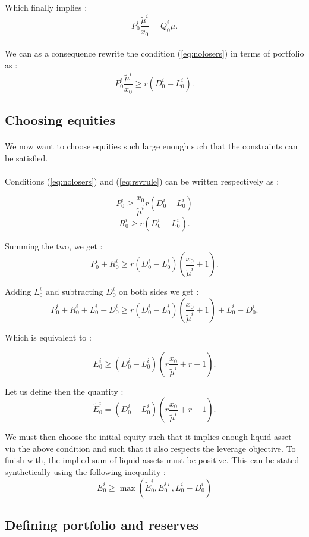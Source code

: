 \documentclass{article}
\begin{document}
\begin{appendices}
Which finally implies : 
$$ P_0^i \frac{\tilde{\mu}^i}{x_0} = Q_0^{i} \mu.$$

\paragraph{}
We can as a consequence rewrite the condition (\ref{eq:nolosers}) in terms of portfolio as :
$$P_0^i \frac{\tilde{\mu}^i}{x_0} \geq r(D_0^i - L_0^i).$$

\subsection{Choosing equities}

\paragraph{}
We now want to choose equities such large enough such that the constraints can be satisfied. 

\paragraph{}
Conditions (\ref{eq:nolosers}) and (\ref{eq:rsvrule}) can be written respectively as : 

$$P_0^i \geq \frac{x_0}{\tilde{\mu}^i}r(D_0^i - L_0^i)$$
$$R_0^i \geq r(D_0^i - L_0^i).$$

Summing the two, we get : 
$$P_0^i + R_0^i  \geq r(D_0^i - L_0^i)(\frac{x_0}{\tilde{\mu}^i} + 1).$$

Adding $L_0^i$ and subtracting  $D_0^i$ on both sides we get : 
$$P_0^i + R_0^i + L_0^i - D_0^i \geq r(D_0^i - L_0^i)(\frac{x_0}{\tilde{\mu}^i} + 1) + L_0^i - D_0^i.$$

Which is equivalent to : 

$$E_0^i\geq (D_0^i - L_0^i)(r\frac{x_0}{\tilde{\mu}^i} + r - 1).$$

Let us define then the quantity :
$$\tilde{E}_0^i = (D_0^i - L_0^i)(r\frac{x_0}{\tilde{\mu}^i} + r - 1).$$

We must then choose the initial equity such that it implies enough liquid asset via the above condition and such that it also respects the leverage objective. To finish with, the implied sum of liquid assets must be positive. This can be stated synthetically using the following inequality : 
$$E_0^i\geq \max (\tilde{E}_0^i, E_0^{i \star}, L_0^i - D_0^i ) $$

\subsection{Defining portfolio and reserves}


\end{appendices}
\end{document}

